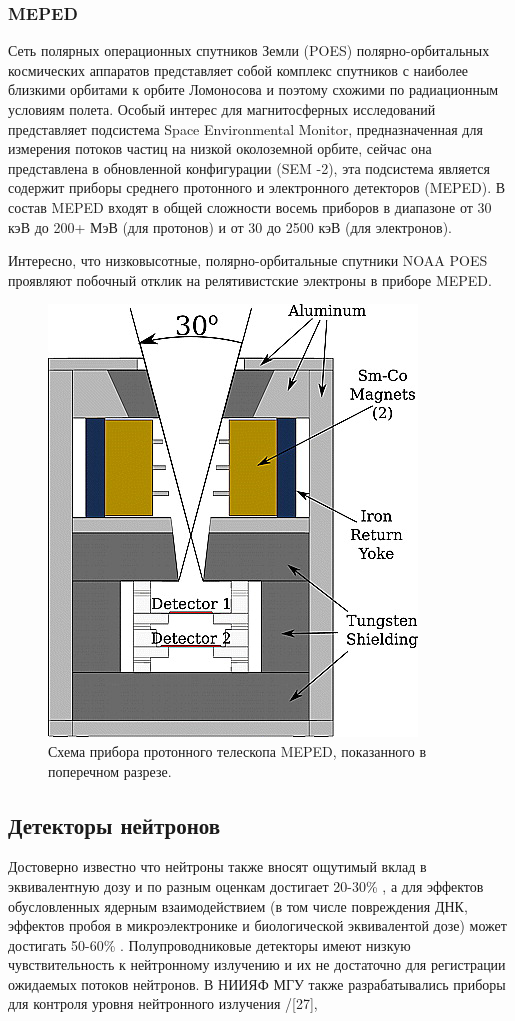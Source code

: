 \subsubsection{MEPED}
Сеть полярных операционных спутников Земли (POES) полярно-орбитальных космических аппаратов представляет собой комплекс спутников с наиболее близкими орбитами к орбите Ломоносова и поэтому схожими по радиационным условиям полета. Особый интерес для магнитосферных исследований представляет подсистема Space Environmental Monitor, предназначенная для измерения потоков частиц на низкой околоземной орбите, сейчас она представлена ​​в обновленной конфигурации (SEM -2), эта подсистема является содержит приборы среднего протонного и электронного детекторов (MEPED).
В состав MEPED входят в общей сложности восемь приборов в диапазоне от 30 кэВ до 200+ МэВ (для протонов) и от 30 до 2500 кэВ (для электронов).

Интересно, что низковысотные, полярно-орбитальные спутники NOAA POES проявляют побочный отклик на релятивистские электроны в приборе MEPED\cite{Yando2011}.
\begin{figure}
	\centering
	\includegraphics[width=0.3\linewidth]{images/jgra21383-fig-0002}
	\caption{Схема прибора протонного телескопа MEPED, показанного в поперечном разрезе.\cite{Yando2011}}
	\label{fig:jgra21383-fig-0002}
\end{figure}


\subsection{Детекторы нейтронов} \label{subsect1_3_1}


Достоверно известно что нейтроны также вносят ощутимый вклад в эквивалентную дозу и по разным оценкам достигает 20-30\% \cite{Dudkin1990}, а для эффектов обусловленных ядерным взаимодействием (в том числе повреждения ДНК, эффектов пробоя в микроэлектронике и биологической эквивалентой дозе) может достигать 50-60\% \cite{Armstrong2001}. Полупроводниковые детекторы имеют низкую чувствительность к нейтронному излучению и их не достаточно для регистрации ожидаемых потоков нейтронов. В НИИЯФ МГУ также разрабатывались приборы для контроля уровня нейтронного излучения  /[27],\cite{Shavrin2002}

